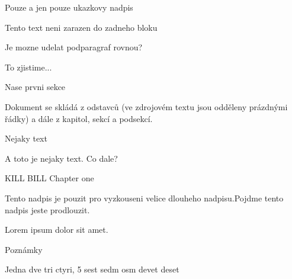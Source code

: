 

\chyph
\fontfam[Schola]\typosize[11/13]

\tit Pouze a jen pouze ukazkovy nadpis

Tento text neni zarazen do zadneho bloku

\secc Je mozne udelat podparagraf rovnou?

To zjistime...

\sec Nase prvni sekce

Dokument se skládá z odstavců (ve zdrojovém textu jsou odděleny prázdnými řádky)
a dále z kapitol, sekcí a podsekcí.

\secc Nejaky text

A toto je nejaky text.
Co dale?

\chap KILL BILL Chapter one

\secc Tento nadpis je pouzit pro vyzkouseni velice dlouheho nadpisu.\nl Pojdme tento nadpis jeste prodlouzit.

Lorem ipsum dolor sit amet.

\secc Poznámky

Jedna dve tri ctyri, 5 sest sedm osm devet deset

\bye
